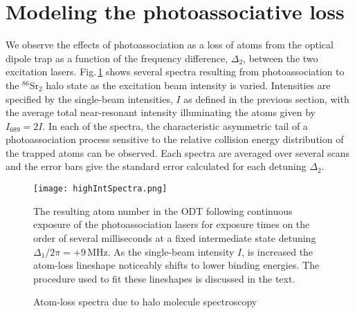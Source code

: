 



\section{Modeling the photoassociative loss} \label{sec:highE_paLoss}
We observe the effects of photoassociation as a loss of atoms from the optical dipole trap as a function of the frequency difference, $\Delta_2$, between the two excitation lasers.
Fig.\,\ref{fig:highIntSpectra} shows several spectra resulting from photoassociation to the $^{86}$Sr$_2$ halo state as the excitation beam intensity is varied.
Intensities are specified by the single-beam intensities, $I$ as defined in the previous section, with the average total near-resonant intensity illuminating the atoms given by $I_{\text{689}}=2I$.
In each of the spectra, the characteristic asymmetric tail of a photoassociation process sensitive to the relative collision energy distribution of the trapped atoms can be observed.
Each spectra are averaged over several scans and the error bars give the standard error calculated for each detuning $\Delta_2$.
	\begin{figure}
		\centerline{
		\texttt{[image: highIntSpectra.png]}}
		\caption{Atom-loss spectra due to halo molecule spectroscopy}{The resulting atom number in the ODT following continuous exposure of the photoassociation lasers for exposure times on the order of several milliseconds at a fixed intermediate state detuning $\Delta_1/2\pi=+$9\,MHz. As the single-beam intensity $I$, is increased the atom-loss  lineshape noticeably shifts to lower binding energies. The procedure used to fit these lineshapes is discussed in the text.}
		\label{fig:highIntSpectra}
	\end{figure}
	
